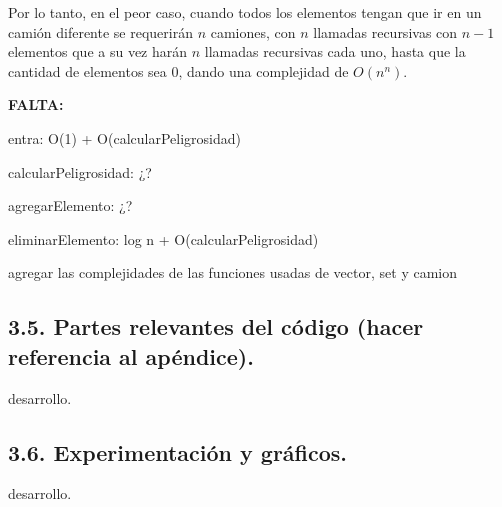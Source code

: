 Por lo tanto, en el peor caso, cuando todos los elementos tengan que ir en un 
camión diferente se requerirán $n$ camiones, con $n$ llamadas recursivas con 
$n - 1$ elementos que a su vez harán $n$ llamadas recursivas cada uno, hasta que
la cantidad de elementos sea 0, dando una complejidad de $O(n^n)$.

\textbf{FALTA:}

entra: O(1) + O(calcularPeligrosidad)

calcularPeligrosidad: ¿?

agregarElemento: ¿?

eliminarElemento: log n + O(calcularPeligrosidad)

agregar las complejidades de las funciones usadas de vector, set y camion

\vspace*{0.75cm} \noindent





\subsection{3.5. Partes relevantes del código (hacer referencia al apéndice).}

\vspace*{0.3cm}

desarrollo.


\vspace*{0.75cm} \noindent





\subsection{3.6. Experimentación y gráficos.}

\vspace*{0.3cm}

desarrollo.
